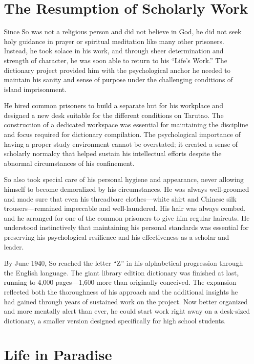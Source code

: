 \documentclass[
  Letterpaper,
]{scrbook}
\begin{document}
\section{The Resumption of Scholarly
Work}\label{the-resumption-of-scholarly-work}

Since So was not a religious person and did not believe in God, he did
not seek holy guidance in prayer or spiritual meditation like many other
prisoners. Instead, he took solace in his work, and through sheer
determination and strength of character, he was soon able to return to
his ``Life's Work.'' The dictionary project provided him with the
psychological anchor he needed to maintain his sanity and sense of
purpose under the challenging conditions of island imprisonment.

He hired common prisoners to build a separate hut for his workplace and
designed a new desk suitable for the different conditions on Tarutao.
The construction of a dedicated workspace was essential for maintaining
the discipline and focus required for dictionary compilation. The
psychological importance of having a proper study environment cannot be
overstated; it created a sense of scholarly normalcy that helped sustain
his intellectual efforts despite the abnormal circumstances of his
confinement.

So also took special care of his personal hygiene and appearance, never
allowing himself to become demoralized by his circumstances. He was
always well-groomed and made sure that even his threadbare
clothes---white shirt and Chinese silk trousers---remained impeccable
and well-laundered. His hair was always combed, and he arranged for one
of the common prisoners to give him regular haircuts. He understood
instinctively that maintaining his personal standards was essential for
preserving his psychological resilience and his effectiveness as a
scholar and leader.

By June 1940, So reached the letter ``Z'' in his alphabetical
progression through the English language. The giant library edition
dictionary was finished at last, running to 4,000 pages---1,600 more
than originally conceived. The expansion reflected both the thoroughness
of his approach and the additional insights he had gained through years
of sustained work on the project. Now better organized and more mentally
alert than ever, he could start work right away on a desk-sized
dictionary, a smaller version designed specifically for high school
students.

\section{Life in Paradise}\label{life-in-paradise}
\end{document}

